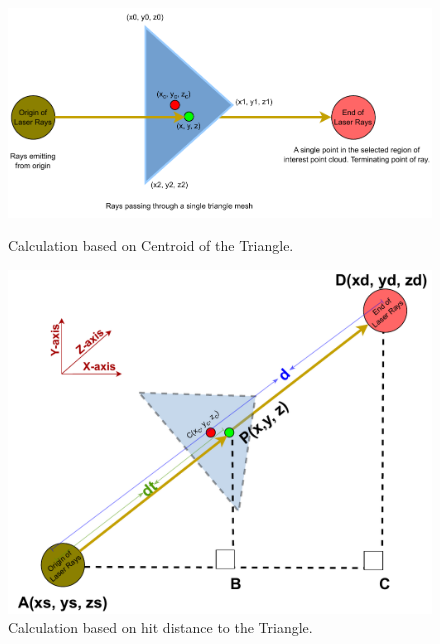 \begin{figure}[htbp]
    \centering
    \begin{minipage}[b]{0.47\textwidth}
    \centering
    \includegraphics[width=1\linewidth]{97_graphics/concepts/raycasting_single_triangle_by_centroid.pdf}
    \caption{Calculation based on Centroid of the Triangle.}
    \label{fig:concept-raycasting_single_triangle_by_centroid}
    \end{minipage}
    \hfill
    \begin{minipage}[b]{0.47\textwidth}
    \centering
    \includegraphics[width=1\linewidth]{97_graphics/concepts/raycasting_single_triangle_by_t_hit.pdf}
    \caption{Calculation based on hit distance to the Triangle.}
    \label{fig:concept-raycasting_single_triangle_by_t_hit}
    \end{minipage}
\end{figure}

